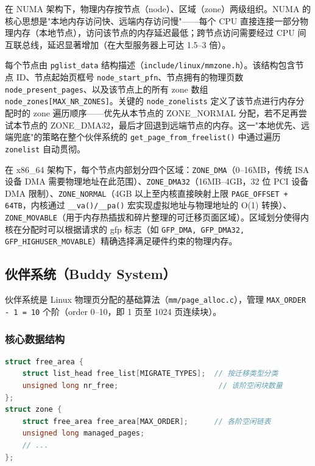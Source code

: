 \documentclass[a4paper]{article}
\begin{document}
在 NUMA 架构下，物理内存按节点（node）、区域（zone）两级组织\cite{gorman}。NUMA 的核心思想是"本地内存访问快、远端内存访问慢"——每个 CPU 直接连接一部分物理内存（本地节点），访问该节点的内存延迟最低；跨节点访问需要经过 CPU 间互联总线，延迟显著增加（在大型服务器上可达 1.5–3 倍）。

每个节点由 \texttt{pglist\_data} 结构描述（\texttt{include/linux/mmzone.h}）。该结构包含节点 ID、节点起始页框号 \texttt{node\_start\_pfn}、节点拥有的物理页数 \texttt{node\_present\_pages}、以及该节点上的所有 zone 数组 \texttt{node\_zones[MAX\_NR\_ZONES]}。关键的 \texttt{node\_zonelists} 定义了该节点进行内存分配时的 zone 遍历顺序——优先从本节点的 ZONE\_NORMAL 分配，若不足再尝试本节点的 ZONE\_DMA32，最后才回退到远端节点的内存。这一"本地优先、远端兜底"的策略在整个伙伴系统的 \texttt{get\_page\_from\_freelist()} 中通过遍历 \texttt{zonelist} 自动贯彻。

在 x86\_64 架构下，每个节点内部划分四个区域：\texttt{ZONE\_DMA}（0–16MB，传统 ISA 设备 DMA 需要物理地址在此范围）、\texttt{ZONE\_DMA32}（16MB–4GB，32 位 PCI 设备 DMA 限制）、\texttt{ZONE\_NORMAL}（4GB 以上至内核直接映射上限 \texttt{PAGE\_OFFSET + 64TB}，内核通过 \texttt{\_\_va()/\_\_pa()} 宏实现虚拟地址与物理地址的 O(1) 转换）、\texttt{ZONE\_MOVABLE}（用于内存热插拔和碎片整理的可迁移页面区域）。区域划分使得内核在分配时可以根据请求的 gfp 标志（如 \texttt{GFP\_DMA, GFP\_DMA32, GFP\_HIGHUSER\_MOVABLE}）精确选择满足硬件约束的物理内存。

\subsection{伙伴系统（Buddy System）}

伙伴系统是 Linux 物理页分配的基础算法（\texttt{mm/page\_alloc.c}），管理 \texttt{MAX\_ORDER - 1 = 10} 个阶（order 0–10，即 1 页至 1024 页连续块）\cite{gorman,mm_doc}。

\subsubsection{核心数据结构}

\begin{lstlisting}[language=C, caption={free\_area — 伙伴系统空闲链表（include/linux/mmzone.h）}, label={lst:free_area}]
struct free_area {
    struct list_head free_list[MIGRATE_TYPES];  // 按迁移类型分类
    unsigned long nr_free;                       // 该阶空闲块数量
};
struct zone {
    struct free_area free_area[MAX_ORDER];      // 各阶空闲链表
    unsigned long managed_pages;
    // ...
};
\end{lstlisting}
\end{document}

